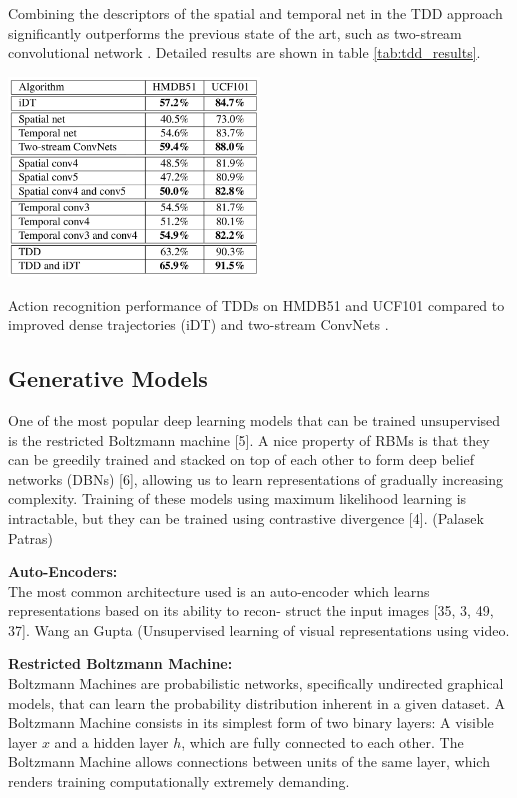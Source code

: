 Combining the descriptors of the spatial and temporal net in the TDD approach significantly outperforms the previous state of the art, such as two-stream convolutional network \cite{simonyan_two-stream_2014}.
Detailed results are shown in table \ref{tab:tdd_results}.

\begin{table}[H]
    \centering
    \includegraphics[width=0.5\textwidth]{img_deep/tdd_results}
    \caption{Action recognition performance of TDDs on HMDB51 and UCF101 compared to improved dense trajectories (iDT) \cite{wang_action_2013} and two-stream ConvNets \cite{simonyan_two-stream_2014}. \cite{wang_action_2015}}
    \label{tab:tdd_results}
\end{table}


\subsection{Generative Models}

One of the most popular deep learning models that can be trained unsupervised is the restricted Boltzmann machine [5]. A nice property of RBMs is that they can be greedily trained and stacked on top of each other to form deep belief networks (DBNs) [6], allowing us to learn representations of gradually increasing complexity. Training of these models using maximum likelihood learning is intractable, but they can be trained using contrastive divergence [4]. (Palasek Patras)

\textbf{Auto-Encoders:}\\
The most common architecture used is an auto-encoder
which learns representations based on its ability to recon-
struct the input images [35, 3, 49, 37]. Wang an Gupta (Unsupervised learning of visual representations using video.

\textbf{Restricted Boltzmann Machine:}\\
Boltzmann Machines are probabilistic networks, specifically undirected graphical models, that can learn the probability distribution inherent in a given dataset.
A Boltzmann Machine consists in its simplest form of two binary layers: A visible layer $x$ and a hidden layer $h$, which are fully connected to each other.
The Boltzmann Machine allows connections between units of the same layer, which renders training computationally extremely demanding.

